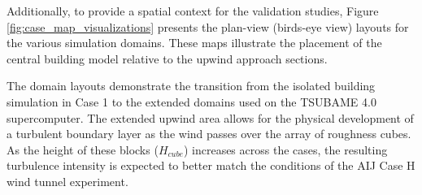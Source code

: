 \begin{table}[ht]
\centering
\caption{Detailed Simulation Case Parameters}
\label{tab:simulation_cases_full}
\end{table}

Additionally, to provide a spatial context for the validation studies, Figure \ref{fig:case_map_visualizations} presents the plan-view (birds-eye view) layouts for the various simulation domains. These maps illustrate the placement of the central building model relative to the upwind approach sections.

The domain layouts demonstrate the transition from the isolated building simulation in Case 1 to the extended domains used on the TSUBAME 4.0 supercomputer. The extended upwind area allows for the physical development of a turbulent boundary layer as the wind passes over the array of roughness cubes. As the height of these blocks ($H_{cube}$) increases across the cases, the resulting turbulence intensity is expected to better match the conditions of the AIJ Case H wind tunnel experiment.

